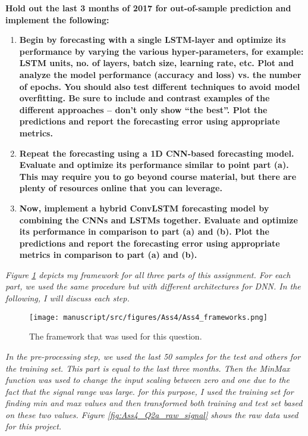 \item \textbf{Hold out the last 3 months of 2017 for out-of-sample prediction and implement the following:} 
\begin{enumerate}
\item \textbf{Begin by forecasting with a single LSTM-layer and optimize its performance by varying the various hyper-parameters, for example: LSTM units, no. of layers, batch  size, learning  rate, etc. Plot and analyze the model performance (accuracy and loss) vs. the number of epochs. You should also test different  techniques to avoid model overfitting. Be sure to include and  contrast examples of the different approaches – don’t only show “the best”. Plot the predictions and report the forecasting error using appropriate metrics.}
\item \textbf{Repeat the forecasting using a 1D CNN-based  forecasting model. Evaluate and optimize its performance similar to point part (a). This may require you to go beyond course material, but there are plenty of resources online that you can leverage.}
\item \textbf{Now, implement a hybrid ConvLSTM forecasting model by combining the CNNs and LSTMs together. Evaluate and optimize its performance in comparison to part (a) and (b). Plot the predictions and report the forecasting error using appropriate metrics in comparison to part (a) and (b).}
\end{enumerate}

\textit{Figure \ref{fig:ass4_frameworks} depicts my framework for all three parts of this assignment. For each part, we used the same procedure but with different architectures for DNN. In the following, I will discuss each step.  }

\begin{figure}[H]
    \centering
    \begin{minipage}[b]{1.1\textwidth}
        \texttt{[image: manuscript/src/figures/Ass4/Ass4\_frameworks.png]}
    \end{minipage}
    \caption{The framework that was used for this question.}
    \label{fig:ass4_frameworks}
\end{figure}


\textit{In the pre-processing step, we used the last 50 samples for the test and others for the training set. This part is equal to the last three months. Then the MinMax function was used to change the input scaling between zero and one due to the fact that the signal range was large. for this purpose, I used the training set for finding min and max values and then transformed both training and test set based on these two values. Figure \ref{fig:Ass4_Q2a_raw_signal} shows the raw data used for this project.}

